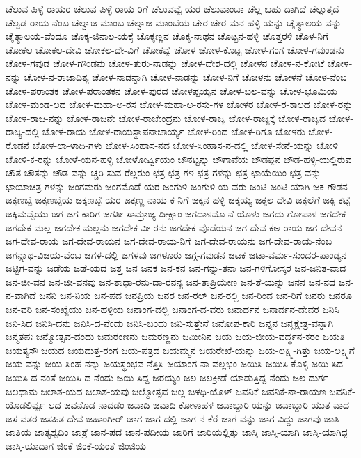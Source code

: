 {ಚೆಲುವ-ಪಿಳ್ಳೆ-ರಾಯರ
ಚೆಲುವ-ಪಿಳ್ಳೆ-ರಾಯ-ರಿಗೆ
ಚೆಲುವವ್ವೆ-ಯರ
ಚೆಲುವಾಂಬಾ
ಚೆಲ್ಲ-ಬಹು-ದಾಗಿದೆ
ಚೆಲ್ಲುತ್ತದೆ
ಚೆಲ್ವಡ-ರಾಯ-ನೆಂಬ
ಚೆಲ್ವಾಜ-ಮಾಂಬ
ಚೆಲ್ವಾಜ-ಮಾಂಬೆಯ
ಚೇರ
ಚೇರ-ಮನ-ಹಳ್ಳಿ-ಯನ್ನು
ಚೈತ್ಯಾಲಯ-ವನ್ನು
ಚೈತ್ಯಾಲಯ-ವೆಂದೂ
ಚೊಕ್ಕ-ಜಿನಾಲ-ಯಕ್ಕೆ
ಚೊಕ್ಕಣ್ಣನ
ಚೊಕ್ಕ-ನಾಥನ
ಚೊಟ್ಟನ-ಹಳ್ಳಿ
ಚೊತ್ತರಳಿ
ಚೊಳ-ನಿಗೆ
ಚೋಕಲ
ಚೋಕಲ-ದೇವಿ
ಚೋಕಲ-ದೇ-ವಿಗೆ
ಚೋಕವ್ವೆ
ಚೋಳ
ಚೋಳ-ಕೊಟ್ಟ
ಚೋಳ-ಗಂಗ
ಚೋಳ-ಗವುಂಡನು
ಚೋಳ-ಗವುಡ
ಚೋಳ-ಗೌಂಡನು
ಚೋಳ-ತುರು-ನಾಡನ್ನು
ಚೋಳ-ದೇಶ-ದಲ್ಲಿ
ಚೋಳನ
ಚೋಳ-ನ-ಕೋಟೆ
ಚೋಳ-ನನ್ನು
ಚೋಳ-ನ-ರಾಜಾದಿತ್ಯ
ಚೋಳ-ನಾಡನ್ನಾಗಿ
ಚೋಳ-ನಾಡನ್ನು
ಚೋಳ-ನಿಗೆ
ಚೋಳನು
ಚೋಳನೆ
ಚೋಳ-ನೆಂಬ
ಚೋಳ-ಪರಾಂತಕ
ಚೋಳ-ಪರಾಂತಕನ
ಚೋಳ-ಪುರದ
ಚೋಳಪ್ಪಯ್ಯನ
ಚೋಳ-ಬಲ-ವನ್ನು
ಚೋಳ-ಭೂಮಿಯ
ಚೋಳ-ಮಂಡ-ಲದ
ಚೋಳ-ಮಹಾ-ಅ-ರಸ
ಚೋಳ-ಮಹಾ-ಅ-ರಸು-ಗಳ
ಚೋಳರ
ಚೋಳ-ರ-ಕಾಲದ
ಚೋಳ-ರನ್ನು
ಚೋಳ-ರಾಜ-ನನ್ನು
ಚೋಳ-ರಾಜನೇ
ಚೋಳ-ರಾಜೇಂದ್ರನು
ಚೋಳ-ರಾಜ್ಯ
ಚೋಳ-ರಾಜ್ಯಕ್ಕೆ
ಚೋಳ-ರಾಜ್ಯದ
ಚೋಳ-ರಾಜ್ಯ-ದಲ್ಲಿ
ಚೋಳ-ರಾಯ
ಚೋಳ-ರಾಯಸ್ಥಾಪನಾಚಾರ್ಯ್ಯ
ಚೋಳ-ರಿಂದ
ಚೋಳ-ರಿಗೂ
ಚೋಳರು
ಚೋಳ-ರೊಡನೆ
ಚೋಳ-ಲಾ-ಳಾದಿ-ಗಳು
ಚೋಳ-ಸಿಂಹಾಸ-ನದ
ಚೋಳ-ಸಿಂಹಾಸ-ನ-ದಲ್ಲಿ
ಚೋಳ-ಸೇನೆ-ಯನ್ನು
ಚೋಳಿ
ಚೋಳಿ-ಕ-ರನ್ನು
ಚೋಳೆ-ಯನ-ಹಳ್ಳಿ
ಚೋಳೋರ್ವ್ವಿಯಂ
ಚೌಕಟ್ಟನ್ನು
ಚೌಗಾವೆಯ
ಚೌಡಪ್ಪನ
ಚೌಡ-ಹಳ್ಳಿ-ಯಲ್ಲಿರುವ
ಚೌತ
ಚೌತನ್ನು
ಚೌತ-ವನ್ನು
ಚ್ಚರಿ-ಸುವ-ರೆಲ್ಲರುಂ
ಛತ್ರ
ಛತ್ರ-ಗಳ
ಛತ್ರ-ಗಳನ್ನು
ಛತ್ರ-ಛಾಯೆಯಿಂ
ಛತ್ರ-ವನ್ನು
ಛಾಯಾಚಿತ್ರ-ಗಳನ್ನು
ಜಂಗಮರು
ಜಂಗಮೊಡೆ-ಯರ
ಜಂಗುಳಿ
ಜಂಗುಳಿ-ಯ-ವರು
ಜಂಟಿ
ಜಂಟಿ-ಯಾಗಿ
ಜಕ-ಗೌಡನ
ಜಕ್ಕಣಬ್ಬೆ
ಜಕ್ಕಣಬ್ಬೆಯ
ಜಕ್ಕಣಬ್ಬೆ-ಯರ
ಜಕ್ಕಣ್ಣ-ನಾಯ-ಕ-ನಿಗೆ
ಜಕ್ಕನ-ಹಳ್ಳಿ
ಜಕ್ಕಯ್ಯ
ಜಕ್ಕಲ-ದೇವಿ
ಜಕ್ಕಲೆಗೆ
ಜಕ್ಕಿ-ಕಟ್ಟೆ
ಜಕ್ಕಿಮವ್ವೆಯು
ಜಗ
ಜಗ-ಕಾರಿಗ
ಜಗತೀ-ಸಾಮ್ರಾಜ್ಯ-ದೀಕ್ಷಾಂ
ಜಗದಾಳಮೊ-ನೆ-ಯೊಳು
ಜಗದು-ಗೋಪಾಳ
ಜಗದೇಕ
ಜಗದೇಕ-ಮಲ್ಲ
ಜಗದೇಕ-ಮಲ್ಲನು
ಜಗದೇಕ-ವೀ-ರನು
ಜಗದೇಕ-ವೊಡೆಯನ
ಜಗ-ದೇವ-ಕಅ-ರಾಯ
ಜಗ-ದೇವನ
ಜಗ-ದೇವ-ರಾಯ
ಜಗ-ದೇವ-ರಾಯನ
ಜಗ-ದೇವ-ರಾಯ-ನಿಗೆ
ಜಗ-ದೇವ-ರಾಯನು
ಜಗ-ದೇವ-ರಾಯ-ನೆಂಬ
ಜಗನ್ನಾಥ-ವಿಜಯ-ವೆಂಬ
ಜಗಳ-ದಲ್ಲಿ
ಜಗಳವು
ಜಗಳೂರು
ಜಗ್ಗ-ಗವುಡನ
ಜಟಕ
ಜಟಾ-ವರ್ಮ-ಸುಂದರ-ಪಾಂಡ್ಯನ
ಜಟ್ಟಿಗ-ವನ್ನು
ಜಡೆಯ
ಜಡೆ-ಯದ
ಜತ್ತ
ಜನ
ಜನಕ
ಜನ-ಕನ
ಜನ-ಗನ್ನು-ತನಾ
ಜನ-ಗಳಿಗೋಸ್ಕರ
ಜನ-ಜನಿತ-ವಾದ
ಜನ-ಜೀ-ವನ
ಜನ-ಜೀ-ವನವು
ಜನ-ತಾಧಾ-ರನು-ದಾ-ರನನ್ಯ
ಜನ-ತಾಪ್ರಿಯೇಣ
ಜನ-ತೆ-ಯನ್ನು
ಜನನ
ಜನ-ನದ
ಜನ-ನ-ವಾಗಿದೆ
ಜನನಿ
ಜನ-ನಿಯ
ಜನ-ಪದ
ಜನಪ್ರಿಯ
ಜನರ
ಜನ-ರಲ್
ಜನ-ರಲ್ಲಿ
ಜನ-ರಿಂದ
ಜನ-ರಿಗೆ
ಜನರು
ಜನರೂ
ಜನ-ವರಿ
ಜನ-ಸಂಖ್ಯೆಯು
ಜನ-ಹಳ್ಳಿಯ
ಜನಾಂಗ-ದಲ್ಲಿ
ಜನಾಂಗ-ದ-ವರು
ಜನಾರ್ದನ
ಜನಾರ್ದನ-ದೇವರ
ಜನಿಸಿ
ಜನಿ-ಸಿದ
ಜನಿಸಿ-ದನು
ಜನಿಸಿ-ದ-ನೆಂದು
ಜನಿಸಿ-ಬಂದು
ಜನಿ-ಸುತ್ತೇನೆ
ಜನೋಪ-ಕಾರಿ
ಜನ್ನನ
ಜನ್ಮಕ್ಷೇತ್ರ-ವನ್ನಾಗಿ
ಜನ್ಮತಪಃ
ಜನ್ಮೋತ್ಸವ-ದಂದು
ಜಮರಂಣನು
ಜಮರಣ್ಣನು
ಜಮೀನಿನ
ಜಯ
ಜಯ-ಜೀಯ-ವರ್ದ್ಧನ-ಕರಂ
ಜಯತಿ
ಜಯತ್ಯಸೌ
ಜಯದ
ಜಯದುತ್ತ-ರಂಗ
ಜಯ-ಪತ್ರದ
ಜಯಮ್ಮನ
ಜಯರೇಖೆ-ಯನ್ನು
ಜಯ-ಲಕ್ಷ್ಮಿ-ಗಿತ್ತು
ಜಯ-ಲಕ್ಷ್ಮಿಗೆ
ಜಯ-ವನ್ನು
ಜಯ-ಸಿಂಹ-ನನ್ನು
ಜಯಸ್ಥಂಭವ-ನೆತ್ತಿಸಿ
ಜಯಾಂಗ-ನಾ-ವಲ್ಲಭಂ
ಜಯಿಸಿ
ಜಯಿಸಿ-ಕೊಳ್ಳಿ
ಜಯಿ-ಸಿದ
ಜಯಿಸಿ-ದ-ನಂತೆ
ಜಯಿಸಿ-ದ-ನೆಂದು
ಜಯಿ-ಸಿದ್ದ
ಜರಯ್ಯಂ
ಜಲ
ಜಲಕ್ರೀಡೆ-ಯಾಡುತ್ತಿದ್ದ-ನೆಂದು
ಜಲ-ದುರ್ಗ
ಜಲಧಾಮ
ಜಲಾಶ-ಯದ
ಜಲಾಶ-ಯವು
ಜಲ್ಮೋತ್ಸವ
ಜಲ್ಲ
ಜಳಧಿ-ಯೊಳ್
ಜವನಿಕೆ
ಜವನಿಕೆ-ನಾ-ರಾಯಣ
ಜವನಿಕೆ-ಯೊಡಲಿರ್ವ್ವ-ಲದ
ಜವನೊಡ-ನಾದಡಂ
ಜವಾದಿ
ಜವಾದಿ-ಕೋಳಾಹಳ
ಜವಾಬ್ದಾರಿ-ಯನ್ನು
ಜವಾಬ್ದಾರಿ-ಯುತ-ವಾದ
ಜಸ-ವತರ
ಜಸಹಿತ-ದೇವ
ಜಹಾಂಗೀರ್
ಜಾಗ
ಜಾಗ-ದಲ್ಲಿ
ಜಾಗ-ನ-ಕೆರೆ
ಜಾಗ-ವನ್ನು
ಜಾಗ-ವಿದ್ದು
ಜಾಗವು
ಜಾತಿ
ಜಾತಿಯ
ಜಾತ್ಯಶ್ವದಿಂ
ಜಾತ್ರೆ
ಜಾನ-ಪದ
ಜಾನ-ಪದೀಯ
ಜಾರಿಗೆ
ಜಾರಿಯಲ್ಲಿತ್ತು
ಜಾಸ್ತಿ
ಜಾಸ್ತಿ-ಯಾಗಿ
ಜಾಸ್ತಿ-ಯಾಗಿದ್ದ
ಜಾಸ್ತಿ-ಯಾದಾಗ
ಜಿಂಕೆ
ಜಿಂಕೆ-ಯಂತೆ
ಜಿಂಜಿಯ
}

